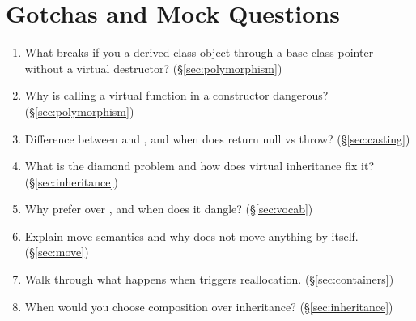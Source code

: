\section{Gotchas and Mock Questions}\label{sec:gotchas}

\begin{enumerate}
  \item What breaks if you  a derived-class object through a base-class pointer without a virtual destructor? (\S\ref{sec:polymorphism})
  \item Why is calling a virtual function in a constructor dangerous? (\S\ref{sec:polymorphism})
  \item Difference between  and , and when does  return null vs throw? (\S\ref{sec:casting})
  \item What is the diamond problem and how does virtual inheritance fix it? (\S\ref{sec:inheritance})
  \item Why prefer  over , and when does it dangle? (\S\ref{sec:vocab})
  \item Explain move semantics and why  does not move anything by itself. (\S\ref{sec:move})
  \item Walk through what happens when  triggers reallocation. (\S\ref{sec:containers})
  \item When would you choose composition over inheritance? (\S\ref{sec:inheritance})
\end{enumerate}
